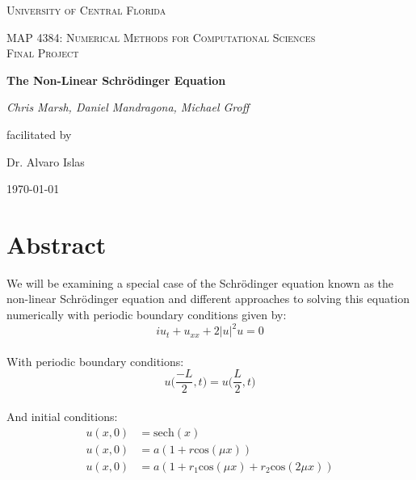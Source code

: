 \documentclass[11pt, oneside]{article}   	%
\begin{document}

\begin{titlepage}
	\centering
	{\scshape\LARGE University of Central Florida \par}
	\vspace{2cm}
	{\scshape\Large MAP 4384: Numerical Methods for Computational Sciences\\ Final Project\par}
	\vspace{2cm}
	{\huge\bfseries The Non-Linear Schr\"odinger Equation\par}
	\vspace{3cm}
	{\Large\itshape Chris Marsh, Daniel Mandragona, Michael Groff\par}
	\vfill
	facilitated by\par
	Dr. Alvaro Islas

	\vfill
    
	{\large \today\par}
\end{titlepage}

\tableofcontents

\pagebreak


\section{Abstract}
We will be examining a special case of the Schr\"odinger equation known as the non-linear Schr\"odinger equation and different approaches to solving this equation numerically with periodic boundary conditions given by:\\
\begin{equation} \label{eq:1}
iu_t + u_{xx} + 2|u|^2u = 0
\end{equation}\\ 
With periodic boundary conditions:\\
\begin{equation} \label{eq:2}
u\Big(\frac{-L}{2}, t\Big) = u\Big(\frac{L}{2}, t\Big)
\end{equation}\\
And initial conditions:
\begin{align*}
    u(x, 0) &= \text{sech}(x)\\
    u(x, 0) &= a(1 + r \text{cos}(\mu x))\\
    u(x, 0) &= a(1 + r_1 \text{cos}(\mu x) + r_2 \text{cos}(2 \mu x))
\end{align*}
\end{document}
